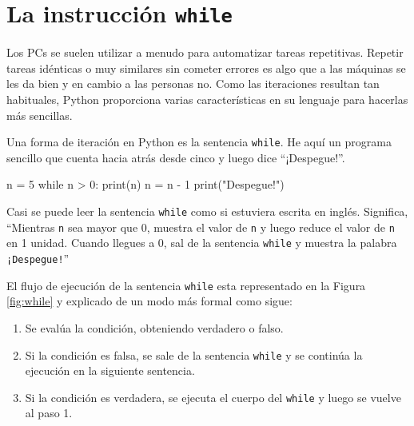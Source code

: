  

\hypertarget{la-instrucción-while}{%
\section{\texorpdfstring{La instrucción
\texttt{while}}{La instrucción while}}\label{la-instrucción-while}}

  
 

Los PCs se suelen utilizar a menudo para automatizar tareas repetitivas.
Repetir tareas idénticas o muy similares sin cometer errores es algo que
a las máquinas se les da bien y en cambio a las personas no. Como las
iteraciones resultan tan habituales, Python proporciona varias
características en su lenguaje para hacerlas más sencillas.

Una forma de iteración en Python es la sentencia \texttt{while}. He aquí
un programa sencillo que cuenta hacia atrás desde cinco y luego dice
``¡Despegue!''.

\begin{python}[frame=single]
n = 5
while n > 0:
    print(n)
    n = n - 1
print("Despegue!")
\end{python}

Casi se puede leer la sentencia \texttt{while} como si estuviera escrita
en inglés. Significa, ``Mientras \texttt{n} sea mayor que 0, muestra el
valor de \texttt{n} y luego reduce el valor de \texttt{n} en 1 unidad.
Cuando llegues a 0, sal de la sentencia \texttt{while} y muestra la
palabra \texttt{¡Despegue!}''



El flujo de ejecución de la sentencia \texttt{while} esta representado en la Figura \ref{fig:while} y explicado
de un modo más formal como sigue:

\begin{enumerate}
\def\labelenumi{\arabic{enumi}.}
\item
  Se evalúa la condición, obteniendo verdadero o falso.
\item
  Si la condición es falsa, se sale de la sentencia \texttt{while} y se
  continúa la ejecución en la siguiente sentencia.
\item
  Si la condición es verdadera, se ejecuta el cuerpo del \texttt{while}
  y luego se vuelve al paso 1.
\end{enumerate}

